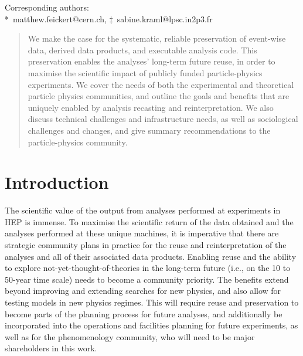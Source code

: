 \documentclass[11pt]{article}
\begin{document}
\begin{center}
Corresponding authors:\\
*~matthew.feickert@cern.ch, $\ddagger$~sabine.kraml@lpsc.in2p3.fr
\end{center}


\begin{abstract}
\noindent We make the case for the systematic, reliable preservation of event-wise data, derived data products, and executable analysis code. This preservation enables the analyses' long-term future reuse, in order to maximise the scientific impact of publicly funded particle-physics experiments.
We cover the needs of both the experimental and theoretical particle physics communities, and outline the goals and benefits that are uniquely enabled by analysis recasting and reinterpretation. 
We also discuss technical challenges and infrastructure needs, as well as sociological challenges and changes, and give summary recommendations to the particle-physics community.
\end{abstract}





\clearpage
%
\tableofcontents
\clearpage
\section{Introduction}

The scientific value of the output from analyses performed at experiments in \gls{HEP} is immense.
To maximise the scientific return of the data obtained and the analyses performed at these unique machines, it is imperative that there are strategic community plans in practice for the reuse and reinterpretation of the analyses and all of their associated data products.
Enabling reuse and the ability to explore not-yet-thought-of-theories in the long-term future (i.e., on the 10 to 50-year time scale) needs to become a community priority.
The benefits extend beyond improving and extending searches for new physics, and also allow for testing models in new physics regimes.%
This will require reuse and preservation to become parts of the planning process for future analyses, and additionally be incorporated into the operations and facilities planning for future experiments, as well as for the phenomenology community, who will need to be major shareholders in this work.
\end{document}
